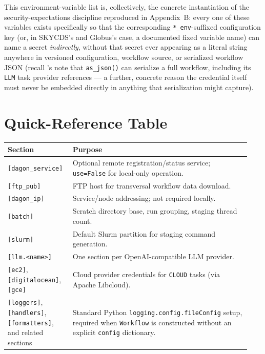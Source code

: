This environment-variable list is, collectively, the concrete instantiation
of the security-expectations discipline reproduced in Appendix~B: every one
of these variables exists specifically so that the corresponding
\texttt{*\_env}-suffixed configuration key (or, in SKYCDS's and Globus's
case, a documented fixed variable name) can name a secret \emph{indirectly},
without that secret ever appearing as a literal string anywhere in
versioned configuration, workflow source, or serialized workflow JSON
(recall 's note that \texttt{as\_json()} can serialize a
full workflow, including its \texttt{LLM} task provider references --- a
further, concrete reason the credential itself must never be embedded
directly in anything that serialization might capture).

\section{Quick-Reference Table}

\begin{center}
\begin{tabular}{@{}p{0.24\linewidth}p{0.70\linewidth}@{}}
\toprule
\textbf{Section} & \textbf{Purpose} \\
\midrule
\texttt{[dagon\_service]} & Optional remote registration/status service;
  \texttt{use=False} for local-only operation. \\
\texttt{[ftp\_pub]} & FTP host for transversal workflow data download. \\
\texttt{[dagon\_ip]} & Service/node addressing; not required locally. \\
\texttt{[batch]} & Scratch directory base, run grouping, staging thread
  count. \\
\texttt{[slurm]} & Default Slurm partition for staging command generation. \\
\texttt{[llm.<name>]} & One section per OpenAI-compatible LLM provider. \\
\texttt{[ec2]}, \texttt{[digitalocean]}, \texttt{[gce]} & Cloud provider
  credentials for \texttt{CLOUD} tasks (via Apache Libcloud). \\
\texttt{[loggers]}, \texttt{[handlers]}, \texttt{[formatters]}, and
  related sections & Standard Python \texttt{logging.config.fileConfig}
  setup, required when \texttt{Workflow} is constructed without an explicit
  \texttt{config} dictionary. \\
\bottomrule
\end{tabular}
\end{center}

